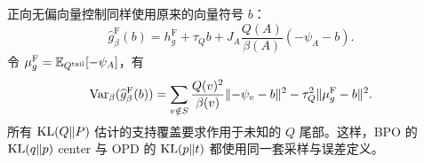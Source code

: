 正向无偏向量控制同样使用原来的向量符号 $b$：
\begin{equation*}
 \widehat g^{\mathrm F}_\beta(b)
 =h_g^{\mathrm F}+\tau_Qb
   +J_A\frac{Q(A)}{\beta(A)}(-\psi_A-b).
\end{equation*}
令 $\mu_g^{\mathrm F}=\mathbb E_{Q^{\mathrm{tail}}}[-\psi_A]$，有
\begin{equation*}
 \operatorname{Var}_\beta(\widehat g^{\mathrm F}_\beta(b))
 =\sum_{v\notin S}\frac{Q(v)^2}{\beta(v)}\lVert-\psi_v-b\rVert^2
  -\tau_Q^2\lVert\mu_g^{\mathrm F}-b\rVert^2.
\end{equation*}
所有 $\operatorname{KL}(Q\Vert P)$ 估计的支持覆盖要求作用于未知的 $Q$ 尾部。这样，BPO 的 $\operatorname{KL}(q\Vert p)$ center 与 OPD 的 $\operatorname{KL}(p\Vert t)$ 都使用同一套采样与误差定义。
